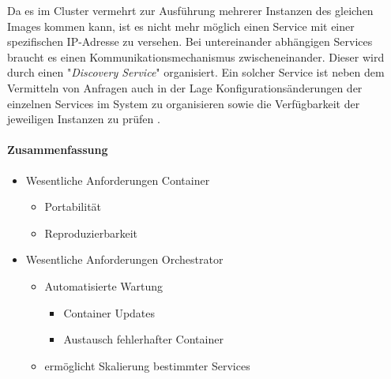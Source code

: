 Da es im Cluster vermehrt zur Ausführung mehrerer Instanzen des gleichen Images kommen kann, ist es nicht mehr möglich einen Service mit einer spezifischen IP-Adresse zu versehen. Bei untereinander abhängigen Services braucht es einen Kommunikationsmechanismus zwischeneinander. Dieser wird durch einen "\emph{Discovery Service}" organisiert. Ein solcher Service ist neben dem Vermitteln von Anfragen auch in der Lage Konfigurationsänderungen der einzelnen Services im System zu organisieren sowie die Verfügbarkeit der jeweiligen Instanzen zu prüfen \cite[Seite~45 ff.]{soppelsaswarm}.

\paragraph{Zusammenfassung}
\begin{itemize}
  \item Wesentliche Anforderungen Container
  \begin{itemize}
    \item Portabilität
    \item Reproduzierbarkeit
  \end{itemize}
  \item Wesentliche Anforderungen Orchestrator
  \begin{itemize}
    \item Automatisierte Wartung 
    \begin{itemize}
      \item Container Updates
      \item Austausch fehlerhafter Container
    \end{itemize}
    \item ermöglicht Skalierung bestimmter Services
  \end{itemize}
\end{itemize}


